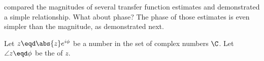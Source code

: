 \begin{sloppypar}
 compared the magnitudes of several transfer function estimates
and demonstrated a simple  relationship.
What about phase? The phase of those estimates is even simpler than the magnitude, as demonstrated next.
\end{sloppypar}
\begin{proposition}    %
Let $z\eqd\abs{z}e^{i\phi}$ be a  number in the set of complex numbers $\C$.
Let $\angle z\eqd\phi$ be the  of $z$.
\end{proposition}

